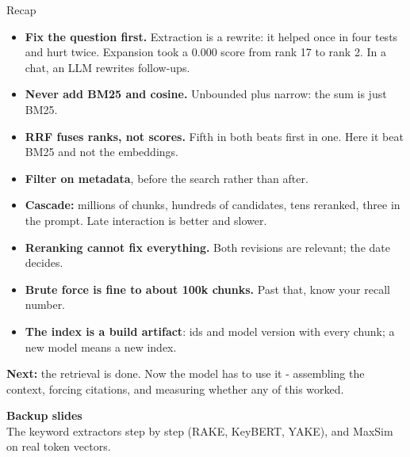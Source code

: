 \documentclass[aspectratio=169]{beamer}
\newcommand{\takebox}[1]{%
  \begin{tcolorbox}[colback=paramgreen!8, colframe=paramgreen, boxrule=0.6pt, arc=2pt]
  #1
  \end{tcolorbox}}
\newcommand{\sectiontransition}[2]{%
  \begin{frame}[plain]
    \vfill
    \begin{center}
      {\Huge\bfseries\color{popblue} #1}\\[1.1em]
      {\large #2}
    \end{center}
    \vfill
  \end{frame}}
\begin{document}
\begin{frame}{Recap}
  \begin{itemize}\small
    \item \textbf{Fix the question first.} Extraction is a rewrite: it helped once in four
      tests and hurt twice. Expansion took a 0.000 score from rank 17 to rank 2. In a chat, an LLM rewrites
      follow-ups.
    \item \textbf{Never add BM25 and cosine.} Unbounded plus narrow: the sum is just BM25.
    \item \textbf{RRF fuses ranks, not scores.} Fifth in both beats first in one. Here it
      beat BM25 and not the embeddings.
    \item \textbf{Filter on metadata}, before the search rather than after.
    \item \textbf{Cascade:} millions of chunks, hundreds of candidates, tens reranked, three
      in the prompt. Late interaction is better and slower.
    \item \textbf{Reranking cannot fix everything.} Both revisions are relevant; the date decides.
    \item \textbf{Brute force is fine to about 100k chunks.} Past that, know your recall
      number.
    \item \textbf{The index is a build artifact}: ids and model version with every chunk; a new model means a new
      index.
  \end{itemize}

  \vspace{0.3em}
  \takebox{\textbf{Next:} the retrieval is done. Now the model has to use it - assembling
  the context, forcing citations, and measuring whether any of this worked.}
\end{frame}


\appendix
\sectiontransition{Backup slides}{The keyword extractors step by step (RAKE, KeyBERT, YAKE), and MaxSim on real
token vectors.}
\end{document}
